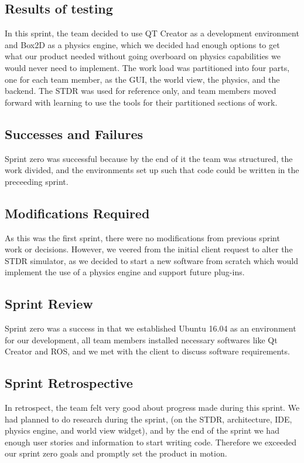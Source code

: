 \subsection{Results of testing}

In this sprint, the team decided to use QT Creator as a development environment and Box2D as a physics engine, which we decided had enough options to get what our product needed without going overboard on physics capabilities we would never need to implement. The work load was partitioned into four parts, one for each team member, as the GUI, the world view, the physics, and the backend. The STDR was used for reference only, and team members moved forward with learning to use the tools for their partitioned sections of work.

\subsection{Successes and Failures}

Sprint zero was successful because by the end of it the team was structured, the work divided, and the environments set up such that code could be written in the preceeding sprint.

\subsection{Modifications Required}

As this was the first sprint, there were no modifications from previous sprint work or decisions. However, we veered from the initial client request to alter the STDR simulator, as we decided to start a new software from scratch which would implement the use of a physics engine and support future plug-ins.

\subsection{Sprint Review}

Sprint zero was a success in that we established Ubuntu 16.04 as an environment for our development, all team members installed necessary softwares like Qt Creator and ROS, and we met with the client to discuss software requirements.

\subsection{Sprint Retrospective}

In retrospect, the team felt very good about progress made during this sprint. We had planned to do research during the sprint, (on the STDR, architecture, IDE, physics engine, and world view widget), and by the end of the sprint we had enough user stories and information to start writing code. Therefore we exceeded our sprint zero goals and promptly set the product in motion.


